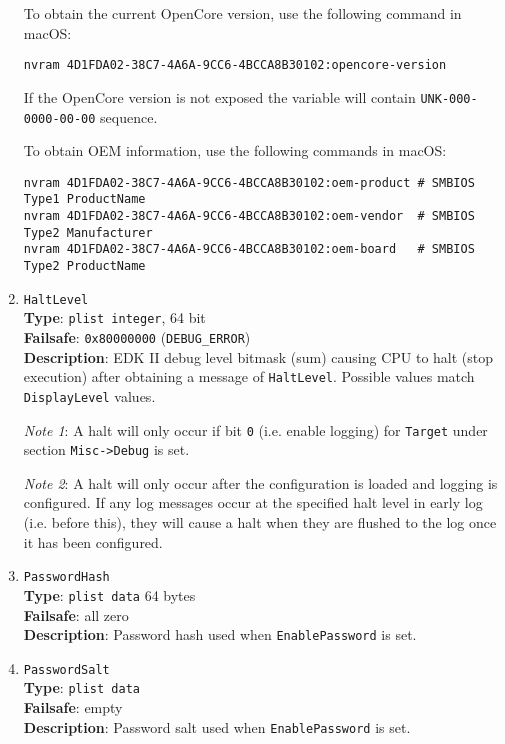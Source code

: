 \documentclass[]{article}
\begin{document}
\begin{enumerate}
  To obtain the current OpenCore version, use the following command in macOS:
\begin{lstlisting}[label=nvramver, style=ocbash]
nvram 4D1FDA02-38C7-4A6A-9CC6-4BCCA8B30102:opencore-version
\end{lstlisting}
  If the OpenCore version is not exposed the variable will contain
  \texttt{UNK-000-0000-00-00} sequence.

  To obtain OEM information, use the following commands in macOS:
\begin{lstlisting}[label=nvramoem, style=ocbash]
nvram 4D1FDA02-38C7-4A6A-9CC6-4BCCA8B30102:oem-product # SMBIOS Type1 ProductName
nvram 4D1FDA02-38C7-4A6A-9CC6-4BCCA8B30102:oem-vendor  # SMBIOS Type2 Manufacturer
nvram 4D1FDA02-38C7-4A6A-9CC6-4BCCA8B30102:oem-board   # SMBIOS Type2 ProductName
\end{lstlisting}

\item
  \texttt{HaltLevel}\\
  \textbf{Type}: \texttt{plist\ integer}, 64 bit\\
  \textbf{Failsafe}: \texttt{0x80000000} (\texttt{DEBUG\_ERROR})\\
  \textbf{Description}: EDK II debug level bitmask (sum) causing CPU to
  halt (stop execution) after obtaining a message of \texttt{HaltLevel}.
  Possible values match \texttt{DisplayLevel} values.

  \emph{Note 1}: A halt will only occur if bit \texttt{0} (i.e. enable logging) for \texttt{Target}
  under section \texttt{Misc->Debug} is set.

  \emph{Note 2}: A halt will only occur after the configuration is loaded and logging is configured.
  If any log messages occur at the specified halt level in early log (i.e. before this), they will
  cause a halt when they are flushed to the log once it has been configured.

\item
  \texttt{PasswordHash}\\
  \textbf{Type}: \texttt{plist\ data} 64 bytes\\
  \textbf{Failsafe}: all zero\\
  \textbf{Description}: Password hash used when \texttt{EnablePassword} is set.

\item
  \texttt{PasswordSalt}\\
  \textbf{Type}: \texttt{plist\ data}\\
  \textbf{Failsafe}: empty\\
  \textbf{Description}: Password salt used when \texttt{EnablePassword} is set.


\end{enumerate}
\end{document}
